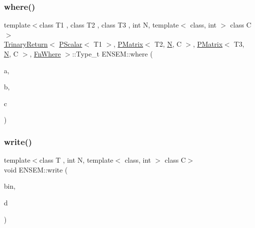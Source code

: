 \subsubsection{\texorpdfstring{where()}{where()}}
{\footnotesize\ttfamily template$<$class T1 , class T2 , class T3 , int N, template$<$ class, int $>$ class C$>$ \\
\mbox{\hyperlink{structENSEM_1_1TrinaryReturn}{Trinary\+Return}}$<$ \mbox{\hyperlink{classENSEM_1_1PScalar}{P\+Scalar}}$<$ T1 $>$, \mbox{\hyperlink{classENSEM_1_1PMatrix}{P\+Matrix}}$<$ T2, \mbox{\hyperlink{operator__name__util_8cc_a7722c8ecbb62d99aee7ce68b1752f337}{N}}, C $>$, \mbox{\hyperlink{classENSEM_1_1PMatrix}{P\+Matrix}}$<$ T3, \mbox{\hyperlink{operator__name__util_8cc_a7722c8ecbb62d99aee7ce68b1752f337}{N}}, C $>$, \mbox{\hyperlink{structENSEM_1_1FnWhere}{Fn\+Where}} $>$\+::Type\+\_\+t E\+N\+S\+E\+M\+::where (\begin{DoxyParamCaption}\item[{const \mbox{\hyperlink{classENSEM_1_1PScalar}{P\+Scalar}}$<$ T1 $>$ \&}]{a,  }\item[{const \mbox{\hyperlink{classENSEM_1_1PMatrix}{P\+Matrix}}$<$ T2, \mbox{\hyperlink{operator__name__util_8cc_a7722c8ecbb62d99aee7ce68b1752f337}{N}}, C $>$ \&}]{b,  }\item[{const \mbox{\hyperlink{classENSEM_1_1PMatrix}{P\+Matrix}}$<$ T3, \mbox{\hyperlink{operator__name__util_8cc_a7722c8ecbb62d99aee7ce68b1752f337}{N}}, C $>$ \&}]{c }\end{DoxyParamCaption})\hspace{0.3cm}{\ttfamily [inline]}}

\mbox{\label{group__primmatrix_ga7255316b449512a4081c99a02e485e4c}} 
\subsubsection{\texorpdfstring{write()}{write()}}
{\footnotesize\ttfamily template$<$class T , int N, template$<$ class, int $>$ class C$>$ \\
void E\+N\+S\+E\+M\+::write (\begin{DoxyParamCaption}\item[{\mbox{\hyperlink{classADATIO_1_1BinaryWriter}{A\+D\+A\+T\+I\+O\+::\+Binary\+Writer}} \&}]{bin,  }\item[{const \mbox{\hyperlink{classENSEM_1_1PMatrix}{P\+Matrix}}$<$ T, \mbox{\hyperlink{operator__name__util_8cc_a7722c8ecbb62d99aee7ce68b1752f337}{N}}, C $>$ \&}]{d }\end{DoxyParamCaption})\hspace{0.3cm}{\ttfamily [inline]}}




